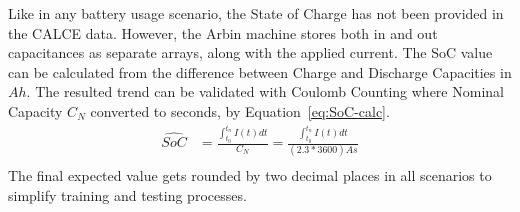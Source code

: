 %
Like in any battery usage scenario, the State of Charge has not been provided in the CALCE data.
However, the Arbin machine stores both in and out capacitances as separate arrays, along with the applied current.
The SoC value can be calculated from the difference between Charge and Discharge Capacities in $Ah$.
The resulted trend can be validated with Coulomb Counting where Nominal Capacity $C_{N}$ converted to seconds, by \mbox{Equation~\ref{eq:SoC-calc}}.
\begin{equation}
    \begin{split}
        \hat{SoC} &= \frac{\int_{t_0}^{t_n} I(t)dt} {C_{N}} = \frac{\int_{t_0}^{t_n} I(t)dt} {(2.3*3600)As} \\
        \label{eq:SoC-calc}
    \end{split}
\end{equation}
The final expected value gets rounded by two decimal places in all scenarios to simplify training and testing processes.


